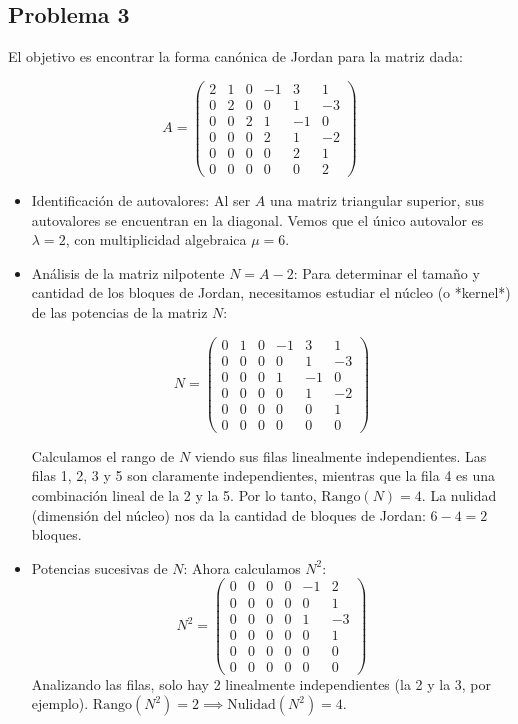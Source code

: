 \documentclass[11pt,spanish]{article}
\begin{document}
\subsection*{Problema 3}

El objetivo es encontrar la forma canónica de Jordan para la matriz dada:

$$A = \begin{pmatrix} 2 & 1 & 0 & -1 & 3 & 1 \\ 0 & 2 & 0 & 0 & 1 & -3 \\ 0 & 0 & 2 & 1 & -1 & 0 \\ 0 & 0 & 0 & 2 & 1 & -2 \\ 0 & 0 & 0 & 0 & 2 & 1 \\ 0 & 0 & 0 & 0 & 0 & 2 \end{pmatrix}$$

\begin{itemize}
\item Identificación de autovalores:
Al ser $A$ una matriz triangular superior, sus autovalores se encuentran en la diagonal. Vemos que el único autovalor es $\lambda = 2$, con multiplicidad algebraica $\mu = 6$.

\item Análisis de la matriz nilpotente $N = A - 2$:
Para determinar el tamaño y cantidad de los bloques de Jordan, necesitamos estudiar el núcleo (o *kernel*) de las potencias de la matriz $N$:

$$N = \begin{pmatrix} 0 & 1 & 0 & -1 & 3 & 1 \\ 0 & 0 & 0 & 0 & 1 & -3 \\ 0 & 0 & 0 & 1 & -1 & 0 \\ 0 & 0 & 0 & 0 & 1 & -2 \\ 0 & 0 & 0 & 0 & 0 & 1 \\ 0 & 0 & 0 & 0 & 0 & 0 \end{pmatrix}$$

Calculamos el rango de $N$ viendo sus filas linealmente independientes. Las filas 1, 2, 3 y 5 son claramente independientes, mientras que la fila 4 es una combinación lineal de la 2 y la 5. 
Por lo tanto, $\text{Rango}(N) = 4$. 
La nulidad (dimensión del núcleo) nos da la cantidad de bloques de Jordan: $6 - 4 = 2$ bloques.

\item Potencias sucesivas de $N$:
Ahora calculamos $N^2$:
$$N^2 = \begin{pmatrix} 0 & 0 & 0 & 0 & -1 & 2 \\ 0 & 0 & 0 & 0 & 0 & 1 \\ 0 & 0 & 0 & 0 & 1 & -3 \\ 0 & 0 & 0 & 0 & 0 & 1 \\ 0 & 0 & 0 & 0 & 0 & 0 \\ 0 & 0 & 0 & 0 & 0 & 0 \end{pmatrix}$$
Analizando las filas, solo hay 2 linealmente independientes (la 2 y la 3, por ejemplo). $\text{Rango}(N^2) = 2 \implies \text{Nulidad}(N^2) = 4$.


\end{itemize}
\end{document}
